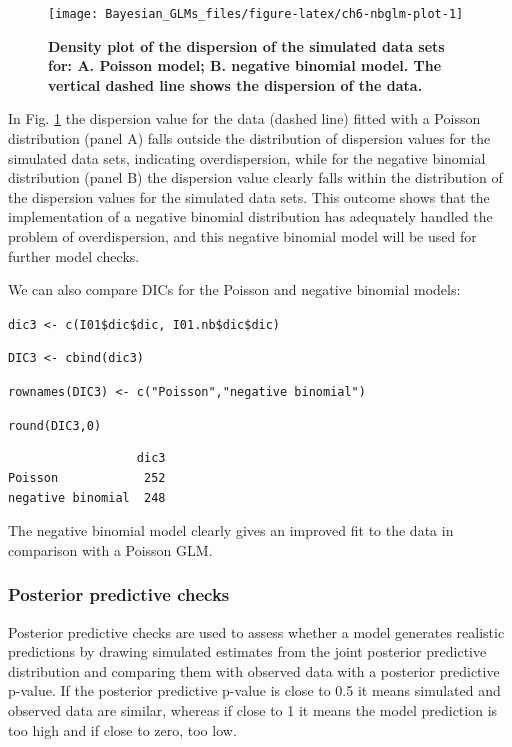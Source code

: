 \documentclass[
]{book}
\begin{document}
\begin{figure}

{\centering \texttt{[image: Bayesian\_GLMs\_files/figure-latex/ch6-nbglm-plot-1]} 

}

\caption{\textbf{Density plot of the dispersion of the simulated data sets for: A. Poisson model; B. negative binomial model. The vertical dashed line shows the dispersion of the data.}}\label{fig:ch6-nbglm-plot}
\end{figure}

In Fig. \ref{fig:ch6-nbglm-plot} the dispersion value for the data (dashed line) fitted with a Poisson distribution (panel A) falls outside the distribution of dispersion values for the simulated data sets, indicating overdispersion, while for the negative binomial distribution (panel B) the dispersion value clearly falls within the distribution of the dispersion values for the simulated data sets. This outcome shows that the implementation of a negative binomial distribution has adequately handled the problem of overdispersion, and this negative binomial model will be used for further model checks.

We can also compare DICs for the Poisson and negative binomial models:

\texttt{dic3\ \textless{}-\ c(I01\$dic\$dic,\ I01.nb\$dic\$dic)}

\texttt{DIC3\ \textless{}-\ cbind(dic3)}

\texttt{rownames(DIC3)\ \textless{}-\ c("Poisson","negative\ binomial")}

\texttt{round(DIC3,0)}

\begin{verbatim}
                  dic3
Poisson            252
negative binomial  248
\end{verbatim}

The negative binomial model clearly gives an improved fit to the data in comparison with a Poisson GLM.

\hypertarget{nbglm-ppc}{%
\subsubsection{Posterior predictive checks}\label{nbglm-ppc}}

Posterior predictive checks are used to assess whether a model generates realistic predictions by drawing simulated estimates from the joint posterior predictive distribution and comparing them with observed data with a posterior predictive p-value. If the posterior predictive p-value is close to 0.5 it means simulated and observed data are similar, whereas if close to 1 it means the model prediction is too high and if close to zero, too low.
\end{document}
